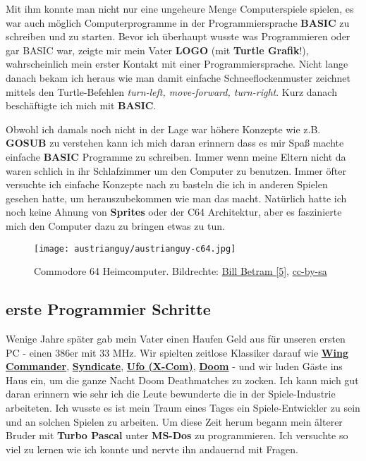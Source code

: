 \documentclass[10pt,a4paper,ngerman,twoside]{article} %
\begin{document}
Mit ihm konnte man nicht nur eine ungeheure Menge Computerspiele spielen, es war auch möglich Computerprogramme in der Programmiersprache \textbf{BASIC} zu schreiben und zu starten. Bevor ich überhaupt wusste was Programmieren oder gar BASIC war, zeigte mir mein Vater \textbf{LOGO} (mit \textbf{Turtle Grafik}!), wahrscheinlich mein erster Kontakt mit einer Programmiersprache. Nicht lange danach bekam ich heraus wie man damit einfache Schneeflockenmuster zeichnet mittels den Turtle-Befehlen \textit{turn-left, move-forward, turn-right}. Kurz danach beschäftigte ich mich mit \textbf{BASIC}.

Obwohl ich damals noch nicht in der Lage war höhere Konzepte wie z.B. \textbf{GOSUB} zu verstehen kann ich mich daran erinnern dass es mir Spaß machte einfache \textbf{BASIC} Programme zu schreiben. Immer wenn meine Eltern nicht da waren schlich in ihr Schlafzimmer um den Computer zu benutzen. Immer öfter versuchte ich einfache Konzepte nach zu basteln die ich in anderen Spielen gesehen hatte, um herauszubekommen wie man das macht. Natürlich hatte ich noch keine Ahnung von \textbf{Sprites} oder der C64 Architektur, aber es faszinierte mich den Computer dazu zu bringen etwas zu tun.

\begin{figure}
\texttt{[image: austrianguy/austrianguy-c64.jpg]}\\
\caption{Commodore 64 Heimcomputer. Bildrechte: \href{https://commons.wikimedia.org/wiki/File:Commodore64.jpg}{Bill Betram [5]}, \href{https://creativecommons.org/licenses/by-sa/2.5/deed.en}{cc-by-sa}}
\end{figure}

\subsection*{erste Programmier Schritte}

Wenige Jahre später gab mein Vater einen Haufen Geld aus für unseren ersten PC - einen 386er mit 33 MHz. Wir spielten zeitlose Klassiker darauf wie \href{https://de.wikipedia.org/wiki/Wing_Commander_(Computerspiel)}{\textbf{Wing Commander}}, \href{https://de.wikipedia.org/wiki/Syndicate}{\textbf{Syndicate}}, \href{https://de.wikipedia.org/wiki/X-COM}{\textbf{Ufo (X-Com)}}, \href{https://de.wikipedia.org/wiki/Doom}{\textbf{Doom}} - und wir luden Gäste ins Haus ein, um die ganze Nacht Doom Deathmatches zu zocken. Ich kann mich gut daran erinnern wie sehr ich die Leute bewunderte die in der Spiele-Industrie arbeiteten. Ich wusste es ist mein Traum eines Tages ein Spiele-Entwickler zu sein und an solchen Spielen zu arbeiten. Um diese Zeit herum begann mein älterer Bruder mit \textbf{Turbo Pascal} unter \textbf{MS-Dos} zu programmieren. Ich versuchte so viel zu lernen wie ich konnte und nervte ihn andauernd mit Fragen.
\end{document}
